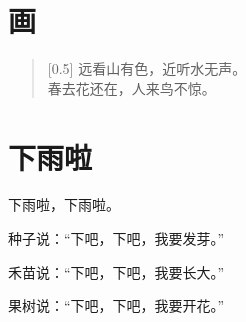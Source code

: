 \documentclass[12pt,UTF-8,openany]{ctexbook}
\begin{document}
\hanzibox{}\hanzibox{}\hanzibox{}\hanzibox{}\hspace{1em}\hanzibox{}\hanzibox{}\hanzibox{}\hanzibox{}

\hanzibox{}\hanzibox{}\hanzibox{}\hanzibox{}\hspace{1em}




\chapter{画}

\begin{large}
    
    \begin{verse}[0.5\linewidth]
        远看山有色，近听水无声。 \\
        春去花还在，人来鸟不惊。
    \end{verse}
    
\end{large}


\clearpage

\begin{center}
    
\end{center}


\hanzibox{}\hanzibox{}\hanzibox{}\hanzibox{}\hspace{1em}\hanzibox{}\hanzibox{}\hanzibox{}\hanzibox{}

\hanzibox{}\hanzibox{}\hanzibox{}\hanzibox{}\hspace{1em}\hanzibox{}\hanzibox{}\hanzibox{}\hanzibox{}

\hanzibox{}\hanzibox{}\hanzibox{}\hanzibox{}\hspace{1em}\hanzibox{}\hanzibox{}\hanzibox{}\hanzibox{}

\hanzibox{}\hanzibox{}\hanzibox{}\hanzibox{}\hspace{1em}\hanzibox{}\hanzibox{}\hanzibox{}\hanzibox{}






\chapter{下雨啦}

\begin{large}
    
    下雨啦，下雨啦。
    
    种子说：“下吧，下吧，我要发芽。”
    
    禾苗说：“下吧，下吧，我要长大。”
    
    果树说：“下吧，下吧，我要开花。”
    
\end{large}
\end{document}
